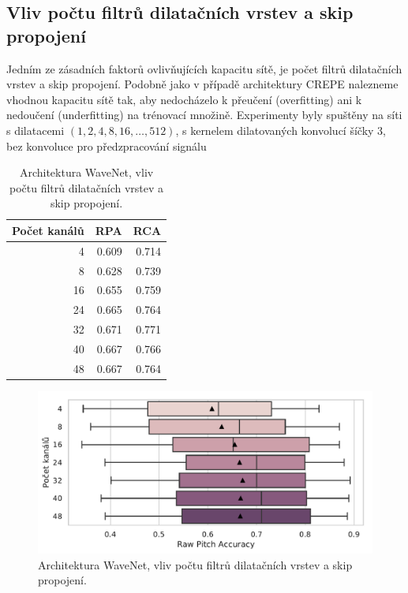 \subsection{Vliv počtu filtrů dilatačních vrstev a skip propojení}

Jedním ze zásadních faktorů ovlivňujících kapacitu sítě, je počet filtrů dilatačních vrstev a skip propojení. Podobně jako v případě architektury CREPE nalezneme vhodnou kapacitu sítě tak, aby nedocházelo k přeučení (overfitting) ani k nedoučení (underfitting) na trénovací množině.
Experimenty byly spuštěny na síti s dilatacemi $(1,2,4,8,16,\dots,512)$, s kernelem dilatovaných konvolucí šíčky 3, bez konvoluce pro předzpracování signálu

\begin{table}[h!]
\centering
    \begin{tabular}{rrr}
    \toprule
    Počet kanálů &   RPA &   RCA \\
    \midrule
            4 & 0.609 & 0.714 \\
            8 & 0.628 & 0.739 \\
            16 & 0.655 & 0.759 \\
            24 & 0.665 & 0.764 \\
            32 & 0.671 & 0.771 \\
            40 & 0.667 & 0.766 \\
            48 & 0.667 & 0.764 \\
    \bottomrule
    \end{tabular}

\caption{Architektura WaveNet, vliv počtu filtrů dilatačních vrstev a skip propojení.}\label{tab:wavenet_dil_skip_channels}
\end{table}

\begin{figure}[h]\centering
    \includegraphics[scale=0.6]{../img/figures/wavenet_dil_skip_channels.pdf}
\caption{Architektura WaveNet, vliv počtu filtrů dilatačních vrstev a skip propojení.}\label{obr:wavenet_dil_skip_channels}
\end{figure}

